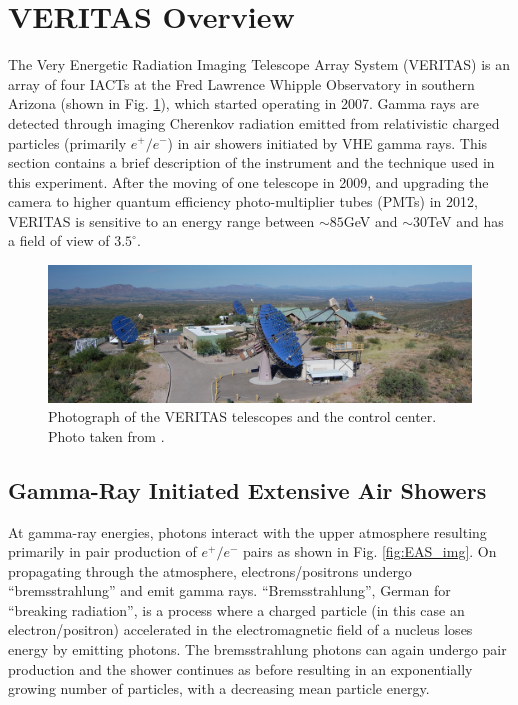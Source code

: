 \documentclass[main.tex]{subfiles}
\begin{document}
\section{VERITAS Overview}
The Very Energetic Radiation Imaging Telescope Array System (VERITAS) \cite{Weekes:1997np} is an array of four IACTs at the Fred Lawrence Whipple Observatory in southern Arizona (shown in Fig. \ref{veritas_standard}), which started operating in 2007. Gamma rays are detected through imaging Cherenkov radiation emitted from relativistic charged particles (primarily $e^+/e^-$) in air showers initiated by VHE gamma rays. This section contains a brief description of the instrument and the technique used in this experiment. After the moving of one telescope in 2009, and upgrading the camera to higher quantum efficiency photo-multiplier tubes (PMTs) in 2012, VERITAS is sensitive to an energy range between $\sim85$GeV and $\sim30$TeV and has a field of view of $3.5^\circ$.
\begin{figure}[htbp]
  \centering
  \includegraphics[width=\linewidth]{images/veritas_standard}
  \caption[Photograph of the VERITAS telescopes and the control center.]{Photograph of the VERITAS telescopes and the control center. Photo taken from \cite{veritas_web}.}
  \label{veritas_standard}
\end{figure}

\subsection{Gamma-Ray Initiated Extensive Air Showers}
\label{Gamma-ray-EAS}
At gamma-ray energies, photons interact with the upper atmosphere resulting primarily in pair production of $e^+/e^-$ pairs as shown in Fig. \ref{fig:EAS_img}. On propagating through the atmosphere, electrons/positrons undergo ``bremsstrahlung'' and emit gamma rays. ``Bremsstrahlung'', German for ``breaking radiation'', is a process where a charged particle (in this case an electron/positron) accelerated in the electromagnetic field of a nucleus loses energy by emitting photons. The bremsstrahlung photons can again undergo pair production and the shower continues as before resulting in an exponentially growing number of particles, with a decreasing mean particle energy.
\end{document}
